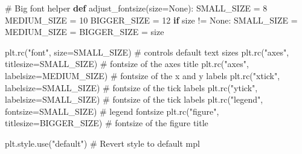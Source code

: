 \documentclass[
  letterpaper,
  DIV=11,
  numbers=noendperiod]{scrreprt}
\newenvironment{Shaded}{\begin{snugshade}}{\end{snugshade}}
\newcommand{\CommentTok}[1]{\textcolor[rgb]{0.37,0.37,0.37}{#1}}
\newcommand{\ControlFlowTok}[1]{\textcolor[rgb]{0.00,0.23,0.31}{\textbf{#1}}}
\newcommand{\DecValTok}[1]{\textcolor[rgb]{0.68,0.00,0.00}{#1}}
\newcommand{\KeywordTok}[1]{\textcolor[rgb]{0.00,0.23,0.31}{\textbf{#1}}}
\newcommand{\NormalTok}[1]{\textcolor[rgb]{0.00,0.23,0.31}{#1}}
\newcommand{\OperatorTok}[1]{\textcolor[rgb]{0.37,0.37,0.37}{#1}}
\newcommand{\StringTok}[1]{\textcolor[rgb]{0.13,0.47,0.30}{#1}}
\newcommand{\VariableTok}[1]{\textcolor[rgb]{0.07,0.07,0.07}{#1}}
\begin{document}
\begin{Shaded}
\begin{Highlighting}[]
\CommentTok{\# Big font helper}
\KeywordTok{def}\NormalTok{ adjust\_fontsize(size}\OperatorTok{=}\VariableTok{None}\NormalTok{):}
\NormalTok{    SMALL\_SIZE }\OperatorTok{=} \DecValTok{8}
\NormalTok{    MEDIUM\_SIZE }\OperatorTok{=} \DecValTok{10}
\NormalTok{    BIGGER\_SIZE }\OperatorTok{=} \DecValTok{12}
    \ControlFlowTok{if}\NormalTok{ size }\OperatorTok{!=} \VariableTok{None}\NormalTok{:}
\NormalTok{        SMALL\_SIZE }\OperatorTok{=}\NormalTok{ MEDIUM\_SIZE }\OperatorTok{=}\NormalTok{ BIGGER\_SIZE }\OperatorTok{=}\NormalTok{ size}

\NormalTok{    plt.rc(}\StringTok{"font"}\NormalTok{, size}\OperatorTok{=}\NormalTok{SMALL\_SIZE)  }\CommentTok{\# controls default text sizes}
\NormalTok{    plt.rc(}\StringTok{"axes"}\NormalTok{, titlesize}\OperatorTok{=}\NormalTok{SMALL\_SIZE)  }\CommentTok{\# fontsize of the axes title}
\NormalTok{    plt.rc(}\StringTok{"axes"}\NormalTok{, labelsize}\OperatorTok{=}\NormalTok{MEDIUM\_SIZE)  }\CommentTok{\# fontsize of the x and y labels}
\NormalTok{    plt.rc(}\StringTok{"xtick"}\NormalTok{, labelsize}\OperatorTok{=}\NormalTok{SMALL\_SIZE)  }\CommentTok{\# fontsize of the tick labels}
\NormalTok{    plt.rc(}\StringTok{"ytick"}\NormalTok{, labelsize}\OperatorTok{=}\NormalTok{SMALL\_SIZE)  }\CommentTok{\# fontsize of the tick labels}
\NormalTok{    plt.rc(}\StringTok{"legend"}\NormalTok{, fontsize}\OperatorTok{=}\NormalTok{SMALL\_SIZE)  }\CommentTok{\# legend fontsize}
\NormalTok{    plt.rc(}\StringTok{"figure"}\NormalTok{, titlesize}\OperatorTok{=}\NormalTok{BIGGER\_SIZE)  }\CommentTok{\# fontsize of the figure title}

\NormalTok{plt.style.use(}\StringTok{"default"}\NormalTok{)  }\CommentTok{\# Revert style to default mpl}
\end{Highlighting}
\end{Shaded}
\end{document}
